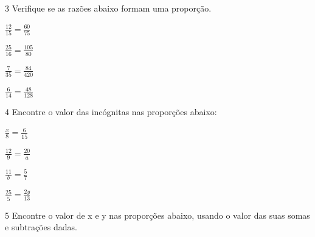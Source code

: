 \num{3} Verifique se as razões abaixo formam uma proporção.

\begin{escolha}
\item $\frac{12}{15} = \frac{60}{75}$  \\
\item $\frac{25}{16} = \frac{105}{80}$  \\
\item $\frac{7}{35} = \frac{84}{420}$  \\
\item $\frac{6}{14} = \frac{48}{128}$  \\
\end{escolha}

\num{4} Encontre o valor das incógnitas nas proporções abaixo:

\begin{escolha}
\item $\frac{x}{8} = \frac{6}{15}$ \  \\
\item $\frac{12}{9} = \frac{20}{a}$ \  \\
\item $\frac{11}{b} = \frac{5}{7}$ \  \\
\item $\frac{25}{5} = \frac{2y}{13}$ \  \\
\end{escolha}

\num{5} Encontre o valor de x e y nas proporções abaixo, usando o valor das
suas somas e subtrações dadas.

